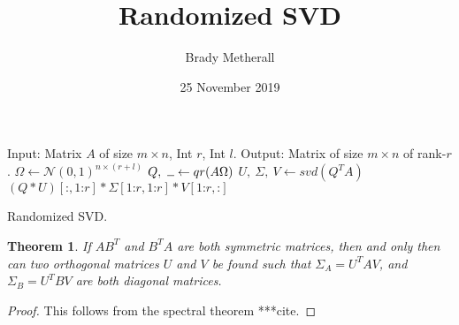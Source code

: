 \documentclass[11pt, a4paper, twocolumn]{article}
\title{Randomized SVD}
\author{Brady Metherall}
\date{25 November 2019}
\newtheorem{theorem}{Theorem}
\begin{document}
\maketitle

\begin{algorithm}
    \begin{algorithmic}
        \State Input: Matrix $A$ of size $m \times n$, Int $r$, Int $l$.
        \State Output: Matrix of size $m \times n$ of rank-$r$.
        \State $\Omega \gets \mathcal{N}(0, 1)^{n \times (r + l)}$
        \State $Q, \ \rule{2mm}{0.15mm} \gets qr(A \Omega)$
        \State $U, \ \Sigma, \ V \gets svd(Q^T A)$ \\
        \Return $(Q * U)[\text{:}, 1\text{:}r] * \Sigma[1 \text{:} r, 1 \text{:} r] * V[1 \text{:} r,\text{:}]$
    \end{algorithmic}
    \caption{Randomized SVD.}
    \label{alg:randsvd}
\end{algorithm}


\begin{theorem}
\label{thm:symm}
If $AB^T$ and $B^TA$ are both symmetric matrices, then and only then can two orthogonal matrices $U$ and $V$ be found such that $\Sigma_A = U^T A V$, and $\Sigma_B = U^T B V$ are both diagonal matrices.
\end{theorem}
\begin{proof}
This follows from the spectral theorem ***cite.
\end{proof}
\end{document}
